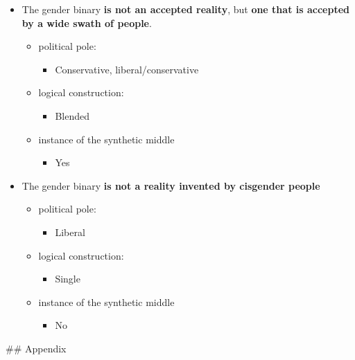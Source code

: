 \documentclass[11pt]{article}
\begin{document}
\begin{itemize}
\begin{itemize}
\item instance of the synthetic middle
\begin{itemize}
\item Yes
\end{itemize}
\end{itemize}
\item The gender binary \textbf{is not an accepted reality}, but \textbf{\textbf{\textbf{one that
is accepted by a wide swath of people}}}.
\begin{itemize}
\item political pole:
\begin{itemize}
\item Conservative, liberal/conservative
\end{itemize}
\item logical construction:
\begin{itemize}
\item Blended
\end{itemize}
\item instance of the synthetic middle
\begin{itemize}
\item Yes
\end{itemize}
\end{itemize}
\item The gender binary \textbf{\textbf{is not a reality invented by cisgender people}}
\begin{itemize}
\item political pole:
\begin{itemize}
\item Liberal
\end{itemize}
\item logical construction:
\begin{itemize}
\item Single
\end{itemize}
\item instance of the synthetic middle
\begin{itemize}
\item No
\end{itemize}
\end{itemize}
\end{itemize}


\#\# Appendix
\end{document}
